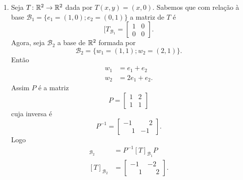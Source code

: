 \begin{exemplos}
\begin{enumerate}[label={\arabic*})]
    \item Seja $T \colon \mathbb{R}^2 \to \mathbb{R}^2$ dada por $T(x,y) = (x,0)$. Sabemos que com relação \`a base $\mathcal{B}_1 = \{e_1=(1,0);e_2=(0,1)\}$ a matriz de $T$ é
    \[
      [T_{\mathcal{B}_1} = \begin{bmatrix}
        1 & 0\\
        0 & 0
      \end{bmatrix}.
    \]
    Agora, seja $\mathcal{B}_2$ a base de $\mathbb{R}^2$ formada por
    \[
      \mathcal{B}_2 = \{w_1 = (1,1);w_2=(2,1)\}.
    \]
    Então
    \begin{align*}
      w_1 &= e_1 + e_2\\
      w_2 &= 2e_1 + e_2.
    \end{align*}
    Assim $P$ é a matriz
    \[
      P = \begin{bmatrix}
        1 & 2\\
        1 & 1
      \end{bmatrix}
    \]
    cuja inversa é
    \[
      P^{-1} = \begin{bmatrix}
        -1 & \phantom{-}2\\
        \phantom{-}1 & -1
      \end{bmatrix}.
    \]
    Logo
    \begin{align*}
      [T]_{\mathcal{B}_2} &= P^{-1}[T]_{\mathcal{B}_1}P\\
      [T]_{\mathcal{B}_2} &= \begin{bmatrix}
        -1 & -2\\
        \phantom{-}1 & \phantom{-}2
      \end{bmatrix}.
    \end{align*}


\end{enumerate}
\end{exemplos}
